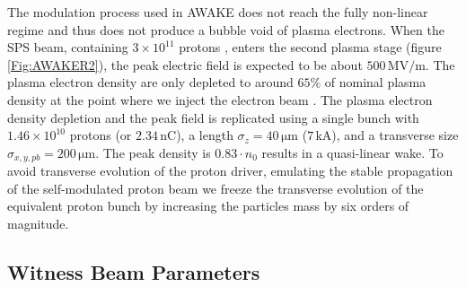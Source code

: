 \documentclass[aps,prstab,reprint,amsmath,amssymb,groupedaddress]{revtex4-1}
\newcommand{\unit}[1]{\,\mathrm{#1}}
\newcommand{\funit}[2]{\,\mathrm{#1}/\mathrm{#2}}
\newcommand{\nexp}[1]{\times 10^{#1}}
\begin{document}

The modulation process used in AWAKE does not reach the fully non-linear regime and thus does not produce a bubble void
of plasma electrons. When the SPS beam, containing $3\nexp{11}$ protons \cite{gschwendtner:2016}, enters the second
plasma stage (figure \ref{Fig:AWAKER2}), the peak electric field is expected to be about $500\funit{MV}{m}$. The plasma
electron density are only depleted to around $65\%$ of nominal plasma density at the point where we inject the electron
beam \cite{awake_collaboration:2016}.  The plasma electron density depletion and the peak field is replicated using a
single %
bunch with $1.46\nexp{10}$ protons (or $2.34\unit{nC}$), a %
length $\sigma_{z} = 40\unit{\mu m}$ ($7\unit{kA}$), and a transverse size $\sigma_{x,y,pb} = 200\unit{\mu m}$.
The peak density is $0.83\cdot n_{0}$ results in a quasi-linear wake. %
To avoid transverse evolution of the proton driver, emulating the stable propagation of the self-modulated proton beam
\cite{lotov:2011, lotov:2015, caldwell:2011} we freeze the transverse evolution of the equivalent proton bunch by
increasing the particles mass by six orders of magnitude.

\subsection{Witness Beam Parameters}\label{S:M:Setup}
\end{document}
